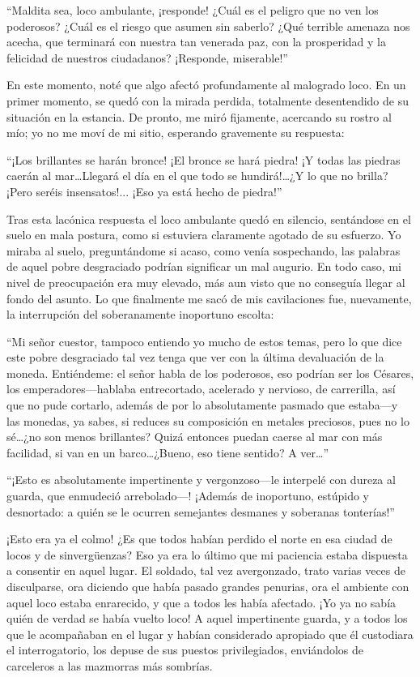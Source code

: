 \documentclass[11pt,openany]{book}
\begin{document}
“Maldita sea, loco ambulante, ¡responde! ¿Cuál es el peligro que no ven los poderosos? ¿Cuál es el riesgo que asumen sin saberlo? ¿Qué terrible amenaza nos acecha, que terminará con nuestra tan venerada paz, con la prosperidad y la felicidad de nuestros ciudadanos? ¡Responde, miserable!” 

En este momento, noté que algo afectó profundamente al malogrado loco. En un primer momento, se quedó con la mirada perdida, totalmente desentendido de su situación en la estancia. De pronto, me miró fijamente, acercando su rostro al mío; yo no me moví de mi sitio, esperando gravemente su respuesta:  

“¡Los brillantes se harán bronce! ¡El bronce se hará piedra! ¡Y todas las piedras caerán al mar\dots Llegará el día en el que todo se hundirá!\dots ¿Y lo que no brilla? ¡Pero seréis insensatos!... ¡Eso ya está hecho de piedra!” 

Tras esta lacónica respuesta el loco ambulante quedó en silencio, sentándose en el suelo en mala postura, como si estuviera claramente agotado de su esfuerzo. Yo miraba al suelo, preguntándome si acaso, como venía sospechando, las palabras de aquel pobre desgraciado podrían significar un mal augurio. En todo caso, mi nivel de preocupación era muy elevado, más aun visto que no conseguía llegar al fondo del asunto. Lo que finalmente me sacó de mis cavilaciones fue, nuevamente, la interrupción del soberanamente inoportuno escolta:

“Mi señor cuestor, tampoco entiendo yo mucho de estos temas, pero lo que dice este pobre desgraciado tal vez tenga que ver con la última devaluación de la moneda. Entiéndeme: el señor habla de los poderosos, eso podrían ser los Césares, los emperadores—hablaba entrecortado, acelerado y nervioso, de carrerilla, así que no pude cortarlo, además de por lo absolutamente pasmado que estaba—y las monedas, ya sabes, si reduces su composición en metales preciosos, pues no lo sé\dots ¿no son menos brillantes? Quizá entonces puedan caerse al mar con más facilidad, si van en un barco\dots ¿Bueno, eso tiene sentido? A ver\dots”

“¡Esto es absolutamente impertinente y vergonzoso—le interpelé con dureza al guarda, que enmudeció arrebolado—! ¡Además de inoportuno, estúpido y desnortado: a quién se le ocurren semejantes desmanes y soberanas tonterías!”

¡Esto era ya el colmo! ¿Es que todos habían perdido el norte en esa ciudad de locos y de sinvergüenzas? Eso ya era lo último que mi paciencia estaba dispuesta a consentir en aquel lugar. El soldado, tal vez avergonzado, trato varias veces de disculparse, ora diciendo que había pasado grandes penurias, ora el ambiente con aquel loco estaba enrarecido, y que a todos les había afectado. ¡Yo ya no sabía quién de verdad se había vuelto loco! A aquel impertinente guarda, y a todos los que le acompañaban en el lugar y habían considerado apropiado que él custodiara el interrogatorio, los depuse de sus puestos privilegiados, enviándolos de carceleros a las mazmorras más sombrías. 
\end{document}
